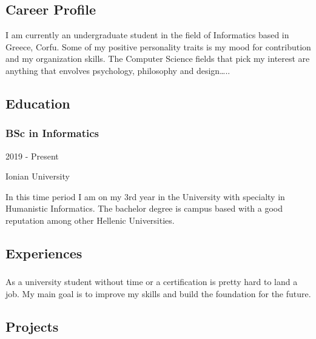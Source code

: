 \documentclass[english,]{article}
\begin{document}
\hypertarget{career-profile}{%
\subsection{\texorpdfstring{{ \emph{} \emph{} } Career
Profile}{    Career Profile}}\label{career-profile}}

I am currently an undergraduate student in the field of Informatics
based in Greece, Corfu. Some of my positive personality traits is my
mood for contribution and my organization skills. The Computer Science
fields that pick my interest are anything that envolves psychology,
philosophy and design\ldots{}..

\hypertarget{education}{%
\subsection{\texorpdfstring{{ \emph{} \emph{} }
Education}{    Education}}\label{education}}

\hypertarget{bsc-in-informatics}{%
\subsubsection{BSc in Informatics}\label{bsc-in-informatics}}

2019 - Present

Ionian University

In this time period I am on my 3rd year in the University with specialty
in Humanistic Informatics. The bachelor degree is campus based with a
good reputation among other Hellenic Universities.

\hypertarget{experiences}{%
\subsection{\texorpdfstring{{ \emph{} \emph{} }
Experiences}{    Experiences}}\label{experiences}}

\hypertarget{section}{%
\subsubsection{}\label{section}}

As a university student without time or a certification is pretty hard
to land a job. My main goal is to improve my skills and build the
foundation for the future.

\hypertarget{projects}{%
\subsection{\texorpdfstring{{ \emph{} \emph{} }
Projects}{    Projects}}\label{projects}}
\end{document}
